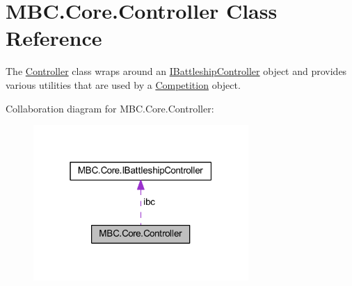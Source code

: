 \hypertarget{class_m_b_c_1_1_core_1_1_controller}{\section{M\-B\-C.\-Core.\-Controller Class Reference}
\label{class_m_b_c_1_1_core_1_1_controller}
}


The \hyperlink{class_m_b_c_1_1_core_1_1_controller}{Controller} class wraps around an \hyperlink{interface_m_b_c_1_1_core_1_1_i_battleship_controller}{I\-Battleship\-Controller} object and provides various utilities that are used by a \hyperlink{class_m_b_c_1_1_core_1_1_competition}{Competition} object.  




Collaboration diagram for M\-B\-C.\-Core.\-Controller\-:
\nopagebreak
\begin{figure}[H]
\begin{center}
\leavevmode
\includegraphics[width=232pt]{class_m_b_c_1_1_core_1_1_controller__coll__graph}
\end{center}
\end{figure}
